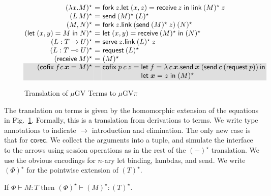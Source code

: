 \documentclass[orivec,envcountsame]{llncs}
\makeatletter
\newcommand{\gvdual}[1]{\overline{#1}}
\newcommand{\lto}{\ensuremath{\multimap}}
\newcommand{\uto}{\ensuremath{\rightarrow}}
\newcommand{\outterm}{\mkwd{end}_!}
\newcommand{\gvtyp}[3]{#1 \vdash #2 : #3}
\newcommand{\mkwd}[1]{\mathsf{#1}}
\newcommand{\gvsend}[2]{\mkwd{send}\:#1\:#2}
\newcommand{\gvreceive}[1]{\mkwd{receive}\:#1}
\newcommand{\gvlet}[3]{\mkwd{let}\;#1 = #2\;\mkwd{in}\;#3}
\newcommand{\gvlink}[2]{\mkwd{link}\:#1\:#2}
\newcommand{\gvfork}[2]{\mkwd{fork}\:#1.#2}
\newcommand{\lrkwd}{\mkwd{cofix}}
\newcommand{\gvfix}[3]{\lrkwd\:#1\:#2 = #3}
\newcommand{\gvserve}[2]{\mkwd{serve}\:#1.#2}
\newcommand{\gvrequest}[1]{\mkwd{request}\:#1}
\newcommand{\key}{\mkwd}
\newcommand{\cofix}{\lrkwd}
\newcommand{\topi}[1]{({#1})^\star}
\newcommand{\mugv}{$\mu\mathrm{GV}$\xspace}
\newcommand{\gvpi}{$\mu\mathrm{GV}\pi$\xspace}
\newcommand{\ba}{\begin{array}}
\newcommand{\ea}{\end{array}}
\newcommand{\bl}{\ba[t]{@{}l@{}}}
\newcommand{\el}{\ea}
\newenvironment{equations}{\[\ba{@{}r@{~}c@{~}l@{}}}{\ea\]}
\newcommand\shaderow{\noalign{\vskip-0.4pt}\rowcolor{shade}[0.6mm]}
\makeatother
\begin{document}
\begin{figure}[float]
\vspace{-2mm}
\small
\begin{equations}
\topi{\lambda x.M} &=& \gvfork{z}{\gvlet{(x, z)}{\gvreceive{z}}{\gvlink{\topi{M}}{z}}} \\
\topi{L\,M} &=& \gvsend{\topi{M}}{\topi{L}} \\
\topi{M, N} &=&
  \gvfork{z}
    {\gvlink{(\gvsend{\topi{M}}{z})}{\topi{N}}} \\
\topi{\gvlet{(x, y)}{M}{N}} &=&
    \gvlet{(x, y)}{\gvreceive{\topi{M}}}{\topi{N}} \\
\topi{L : T \uto U} &=&
  \gvserve{z}{\gvlink{\topi{L}}{z}} \\
\topi{L : T \lto U} &=& \gvrequest{\topi{L}} \\
\topi{\gvreceive{M}} &=& \topi{M}
\\ \shaderow
\topi{\gvfix{f}{\!c\,\vec{x}}{M}} &=&
   \cofix\:p\:c\:z =
     \bl
     \key{let}\:f = \lambda\,c\,\vec{x}.\gvsend{\vec{x}}{(\gvsend{c}{(\gvrequest{p})})}\:\key{in} \\
     \gvlet{\vec{x}}{z}{\topi{M}} \\
     \el \\
\end{equations}%
\vspace{-2mm}
\caption{Translation of \mugv Terms to \gvpi}\label{fig:togvpi}
\end{figure}

The translation on terms is given by the homomorphic extension of the equations in
Fig.~\ref{fig:togvpi}.  Formally, this is a translation from derivations to terms. We write type
annotations to indicate $\to$ introduction and elimination.
%
The only new case is that for $\key{corec}$. We collect the arguments into a tuple, and simulate the
interface to the arrows using session operations as in the rest of the $\topi{-}$ translation.
%
We use the obvious encodings for $n$-ary let binding, lambdas, and send.
%
We write $\topi{\Phi}$ for the pointwise extension of $\topi{T}$.
\begin{theorem}
If $\gvtyp{\Phi}{M}{T}$ then $\gvtyp{\topi{\Phi}}{\topi{M}}{\topi{T}}$.
\end{theorem}
\end{document}
